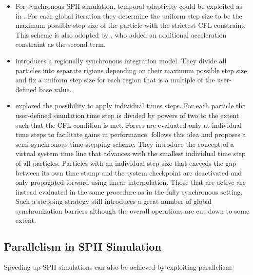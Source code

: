 \documentclass[
	11pt, 
	DIV10,
	ngerman,
	a4paper, 
	oneside, 
	headings=normal, 
	captions=tableheading,
	final, 
	numbers=noenddot
]{scrartcl}
\begin{document}
\begin{itemize}
    \item For synchronous SPH simulation, temporal adaptivity could be exploited as in \cite{desbrun1996smoothed}. For each global iteration they determine the uniform step size to be the maximum possible step size of the particle with the strictest CFL constraint. This scheme is also adopted by \cite{bender2010boundary}, who added an additional acceleration constraint as the second term.
    \item \cite{goswami2014regional} introduces a regionally synchronous integration model. They divide all particles into separate rigions depending on their maximum possible step size and fix a uniform step size for each region that is a multiple of the user-defined base value.
    \item \cite{desbrun1996smoothed} explored the possibility to apply individual times steps. For each particle the user-defined simulation time step is divided by powers of two to the extent such that the CFL condition is met. Forces are evaluated only at individual time steps to facilitate gains in performance. \cite{ban2018adaptively} follows this idea and proposes a semi-synchronous time stepping scheme. They introduce the concept of a virtual system time line that advances with the smallest individual time step of all particles. Particles with an individual step size that exceeds the gap between its own time stamp and the system checkpoint are deactivated and only propagated forward using linear interpolation. Those that are active are instead evaluated in the same procedure as in the fully synchronous setting. Such a stepping strategy still introduces a great number of global synchronization barriers although the overall operations are cut down to some extent.
\end{itemize}

\subsection{Parallelism in SPH Simulation}

Speeding up SPH simulations can also be achieved by exploiting parallelism:
\end{document}
